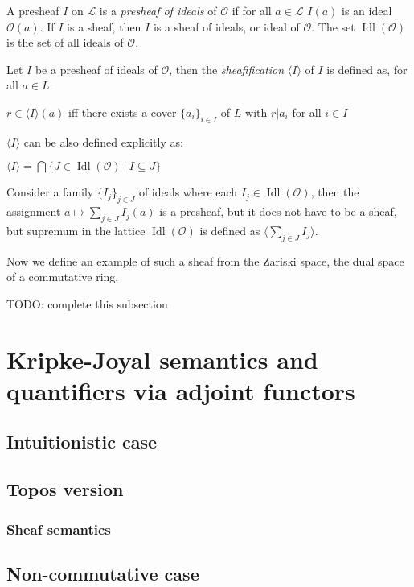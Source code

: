 \documentclass[a4paper]{article}
\theoremstyle{defin}
\theoremstyle{theorem}
\theoremstyle{claim}
\theoremstyle{prop}
\theoremstyle{lemma}
\theoremstyle{fact}
\theoremstyle{ex}
\theoremstyle{col}
\begin{document}
A presheaf $I$ on $\mathcal{L}$ is a \emph{presheaf of ideals} of $\mathcal{O}$ if for all $a \in \mathcal{L}$
$I(a)$ is an ideal $\mathcal{O}(a)$. If $I$ is a sheaf, then $I$ is a sheaf of ideals, or ideal of $\mathcal{O}$. The set $\operatorname{Idl}(\mathcal{O})$ is the set of all ideals of $\mathcal{O}$.

Let $I$ be a presheaf of ideals of $\mathcal{O}$, then the \emph{sheafification} $\langle I \rangle$ of $I$ is defined as, for all $a \in L$:
\begin{center}
$r \in \langle I \rangle(a)$ iff there exists a cover $\{ a_i \}_{i \in I}$ of $L$ with $r|a_i$ for all $i \in I$
\end{center}

$\langle I \rangle$ can be also defined explicitly as:
\begin{center}
$\langle I \rangle = \bigcap \{ J \in \operatorname{Idl}(\mathcal{O}) \: | \: I \subseteq J \}$
\end{center}

Consider a family $\{ I_j \}_{j \in J}$ of ideals where each $I_j \in \operatorname{Idl}(\mathcal{O})$, then the assignment $a \mapsto \sum \limits_{j \in J} I_j(a)$ is a presheaf, but it does not have to be a sheaf, but supremum in the lattice $\operatorname{Idl}(\mathcal{O})$ is defined as $\langle \sum \limits_{j \in J} I_j \rangle$.

Now we define an example of such a sheaf from the Zariski space, the dual space of a commutative ring.

TODO: complete this subsection

\section{Kripke-Joyal semantics and quantifiers via adjoint functors}

\subsection{Intuitionistic case}
\subsection{Topos version}
\subsubsection{Sheaf semantics}

\subsection{Non-commutative case}



\end{document}
